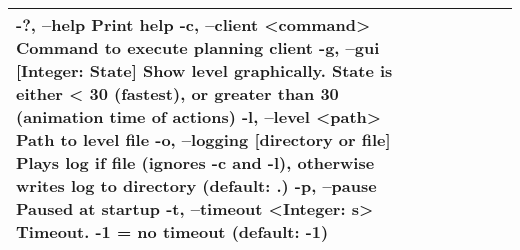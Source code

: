 \begin{tabular}{|l|l|r|r|r|r|}
-?, --help                              Print help                             
-c, --client <command>                  Command to execute planning client     
-g, --gui [Integer: State]              Show level graphically. State is       
                                          either  < 30 (fastest), or greater   
                                          than 30 (animation time of actions)  
-l, --level <path>                      Path to level file                     
-o, --logging [directory or file]       Plays log if file (ignores -c and -l), 
                                          otherwise writes log to directory    
                                          (default: .)                         
-p, --pause                             Paused at startup                      
-t, --timeout <Integer: s>              Timeout. -1 = no timeout (default: -1) 
\\  \hline
\end{tabular}

